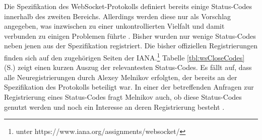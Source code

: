 \documentclass[11pt,a4paper,titlepage]{scrartcl}
\numberwithin{equation}{section}
\begin{document}
\noindent Die Spezifikation des WebSocket-Protokolls definiert bereits einige Status-Codes innerhalb des zweiten Bereichs. Allerdings werden diese nur als Vorschlag angegeben, was inzwischen zu einer unkontrollierten Vielfalt und damit verbunden zu einigen Problemen führte \autocite[53]{gorski_websockets_2015}. Bisher wurden nur wenige Status-Codes neben jenen aus der Spezifikation registriert. Die bisher offiziellen Registrierungen finden sich auf den zugehörigen Seiten der IANA.\footnote{unter https://www.iana.org/assignments/websocket/} Tabelle \ref{tbl:wsCloseCodes} (S.\pageref{tbl:wsCloseCodes}) zeigt einen kurzen Auszug der relevantesten Status-Codes. Es fällt auf, dass alle Neuregistrierungen durch Alexey Melnikov erfolgten, der bereits an der Spezifikation des Protokolls beteiligt war. In einer der betreffenden Anfragen zur Registrierung eines Status-Codes fragt Melnikov auch, ob diese Status-Codes genutzt werden und noch ein Interesse an deren Registrierung besteht \autocite{melnikov_additional_2012}.
\end{document}

